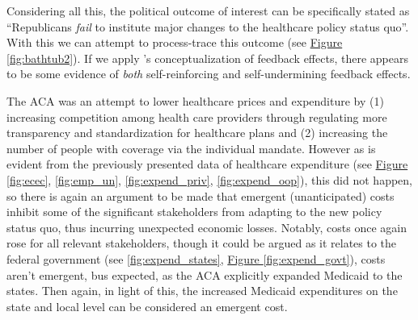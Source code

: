 \documentclass[11pt]{article}
\begin{document}
Considering all this, the political outcome of interest can be specifically stated as \enquote{Republicans \textit{fail} to institute major changes to the healthcare policy status quo}. With this we can attempt to process-trace this outcome (see \hyperref[fig:bathtub2]{Figure \ref*{fig:bathtub2}}). If we apply \citeauthor[][]{Busemeyer2019}'s \parencite*{Busemeyer2019} conceptualization of feedback effects, there appears to be some evidence of \textit{both} self-reinforcing and self-undermining feedback effects.

The ACA was an attempt to lower healthcare prices and expenditure by (1) increasing competition among health care providers through regulating more transparency and standardization for healthcare plans and (2) increasing the number of people with coverage via the individual mandate. However as is evident from the previously presented data of healthcare expenditure (see \hyperref[fig:ecec]{Figure \ref*{fig:ecec}}, \hyperref[fig:ecec]{\ref*{fig:emp_un}}, \hyperref[fig:expend_priv]{\ref*{fig:expend_priv}}, \hyperref[fig:expend_oop]{\ref*{fig:expend_oop}}), this did not happen, so there is again an argument to be made that emergent (unanticipated) costs inhibit some of the significant stakeholders from adapting to the new policy status quo, thus incurring unexpected economic losses. Notably, costs once again rose for all relevant stakeholders, though it could be argued as it relates to the federal government (see \hyperref[fig:expend_states]{\ref*{fig:expend_states}}, \hyperref[fig:expend_govt]{Figure \ref*{fig:expend_govt}}), costs aren't emergent, bus expected, as the ACA explicitly expanded Medicaid to the states. Then again, in light of this, the increased Medicaid expenditures on the state and local level can be considered an emergent cost.
\end{document}
